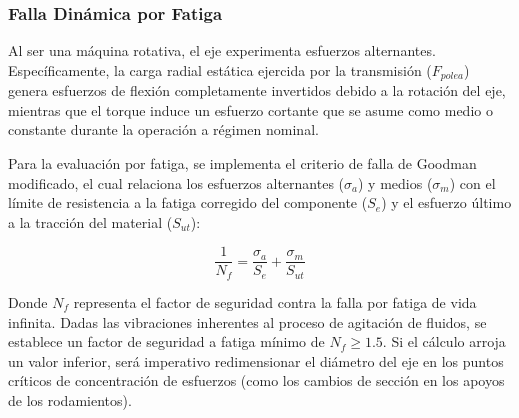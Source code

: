 \documentclass[12pt, a4paper]{article}
\begin{document}
\subsubsection{Falla Dinámica por Fatiga}
Al ser una máquina rotativa, el eje experimenta esfuerzos alternantes. Específicamente, la carga radial estática ejercida por la transmisión ($F_{polea}$) genera esfuerzos de flexión completamente invertidos debido a la rotación del eje, mientras que el torque induce un esfuerzo cortante que se asume como medio o constante durante la operación a régimen nominal.

Para la evaluación por fatiga, se implementa el criterio de falla de Goodman modificado, el cual relaciona los esfuerzos alternantes ($\sigma_a$) y medios ($\sigma_m$) con el límite de resistencia a la fatiga corregido del componente ($S_e$) y el esfuerzo último a la tracción del material ($S_{ut}$):

\begin{equation}
    \frac{1}{N_f} = \frac{\sigma_a}{S_e} + \frac{\sigma_m}{S_{ut}}
\end{equation}

Donde $N_f$ representa el factor de seguridad contra la falla por fatiga de vida infinita. Dadas las vibraciones inherentes al proceso de agitación de fluidos, se establece un factor de seguridad a fatiga mínimo de $N_f \geq 1.5$. Si el cálculo arroja un valor inferior, será imperativo redimensionar el diámetro del eje en los puntos críticos de concentración de esfuerzos (como los cambios de sección en los apoyos de los rodamientos).
\end{document}
